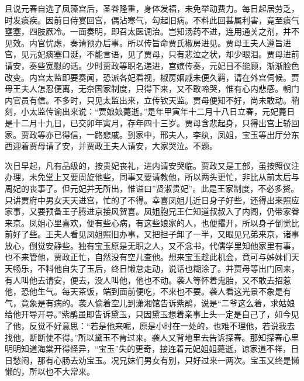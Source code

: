 \begin{parag}
    且说元春自选了凤藻宫后，圣眷隆重，身体发福，未免举动费力。每日起居劳乏，时发痰疾。因前日侍宴回宫，偶沾寒气，勾起旧病。不料此回甚属利害，竟至痰气壅塞，四肢厥冷。一面奏明，即召太医调治。岂知汤药不进，连用通关之剂，并不见效。内官忧虑，奏请预办后事。所以传旨命贾氏椒房进见。贾母王夫人遵旨进宫，见元妃痰塞口涎，不能言语，见了贾母，只有悲泣之状，却少眼泪。贾母进前请安，奏些宽慰的话。少时贾政等职名递进，宫嫔传奏，元妃目不能顾，渐渐脸色改变。内宫太监即要奏闻，恐派各妃看视，椒房姻戚未便久羁，请在外宫伺候。贾母王夫人怎忍便离，无奈国家制度，只得下来，又不敢啼哭，惟有心内悲感。朝门内官员有信。不多时，只见太监出来，立传钦天监。贾母便知不好，尚未敢动。稍刻，小太监传谕出来说：“贾娘娘薨逝。”是年甲寅年十二月十八日立春，元妃薨日是十二月十九日，已交卯年寅月，存年四十三岁。贾母含悲起身，只得出宫上轿回家。贾政等亦已得信，一路悲戚。到家中，邢夫人，李纨，凤姐，宝玉等出厅分东西迎着贾母请了安，并贾政王夫人请安，大家哭泣。不题。
\end{parag}


\begin{parag}
    次日早起，凡有品级的，按贵妃丧礼，进内请安哭临。贾政又是工部，虽按照仪注办理，未免堂上又要周旋他些，同事又要请教他，所以两头更忙，非比从前太后与周妃的丧事了。但元妃并无所出，惟谥曰”贤淑贵妃”。此是王家制度，不必多赘。只讲贾府中男女天天进宫，忙的了不得。幸喜凤姐儿近日身子好些，还得出来照应家事，又要预备王子腾进京接风贺喜。凤姐胞兄王仁知道叔叔入了内阁，仍带家眷来京。凤姐心里喜欢，便有些心病，有这些娘家的人，也便撂开，所以身子倒觉比前好了些。王夫人看见凤姐照旧办事，又把担子卸了一半，又眼见兄弟来京，诸事放心，倒觉安静些。独有宝玉原是无职之人，又不念书，代儒学里知他家里有事，也不来管他，贾政正忙，自然没有空儿查他。想来宝玉趁此机会，竟可与姊妹们天天畅乐，不料他自失了玉后，终日懒怠走动，说话也糊涂了。并贾母等出门回来，有人叫他去请安，便去，没人叫他，他也不动。袭人等怀着鬼胎，又不敢去招惹他，恐他生气。每天茶饭，端到面前便吃，不来也不要。袭人看这光景不象是有气，竟象是有病的。袭人偷着空儿到潇湘馆告诉紫鹃，说是“二爷这么着，求姑娘给他开导开导。”紫鹃虽即告诉黛玉，只因黛玉想着亲事上头一定是自己了，如今见了他，反觉不好意思：“若是他来呢，原是小时在一处的，也难不理他，若说我去找他，断断使不得。”所以黛玉不肯过来。袭人又背地里去告诉探春。那知探春心里明明知道海棠开得怪异，“宝玉”失的更奇，接连着元妃姐姐薨逝，谅家道不祥，日日愁闷，那有心肠去劝宝玉。况兄妹们男女有别，只好过来一两次。宝玉又终是懒懒的，所以也不大常来。
\end{parag}


